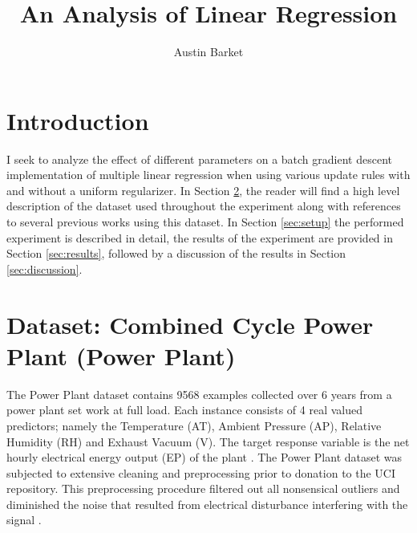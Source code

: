 \documentclass[runningheads]{llncs}
\begin{document}
\pagestyle{headings}
\mainmatter

\title{An Analysis of Linear Regression}
\titlerunning{}
\author{Austin Barket}
 \maketitle


\section{Introduction}

I seek to analyze the effect of different parameters on a batch gradient descent implementation of multiple linear regression when using various update rules with and without a uniform regularizer. In Section \ref{sec:dateset}, the reader will find a high level description of the dataset used throughout the experiment along with references to several previous works using this dataset. In Section \ref{sec:setup} the performed experiment is described in detail, the results of the experiment are provided in Section \ref{sec:results}, followed by a discussion of the results in Section \ref{sec:discussion}.


\section{Dataset: Combined Cycle Power Plant (Power Plant)}
\label{sec:dateset}

The Power Plant dataset contains 9568 examples collected over 6 years from a power plant set work at full load. Each instance consists of 4 real valued predictors; namely the  Temperature (AT), Ambient Pressure (AP), Relative Humidity (RH) and Exhaust Vacuum (V). The target response variable is the net hourly electrical energy output (EP) of the plant \cite{powerPlantDataset}. The Power Plant dataset was subjected to extensive cleaning and preprocessing prior to donation to the UCI repository. This preprocessing procedure filtered out all nonsensical outliers and diminished the noise that resulted from electrical disturbance interfering with the signal \cite{powerPlantCiteRequest1} \cite{powerPlantCiteRequest2}.
\end{document}
